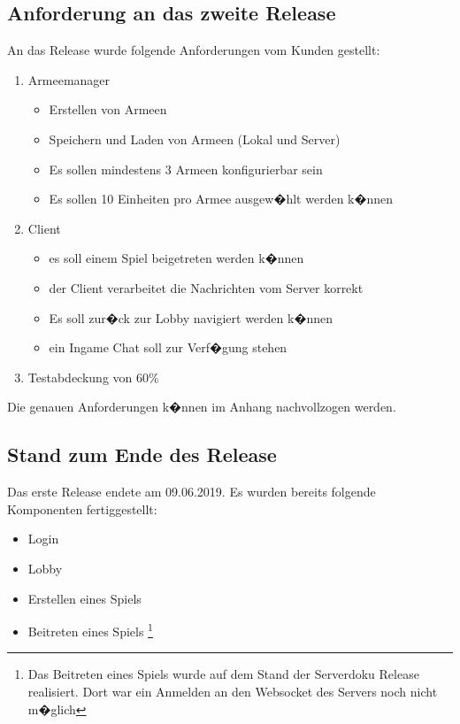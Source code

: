 \documentclass[12pt, titlepage]{scrartcl}
\newcommand{\RN}[1]{%
	\textup{\uppercase\expandafter{\romannumeral#1}}%
}
\begin{document}
		\subsection{Anforderung an das zweite Release}
			An das Release wurde folgende Anforderungen vom Kunden gestellt:
			\begin{enumerate}
				\item Armeemanager
				\begin{itemize}
					\item Erstellen von Armeen 
					\item Speichern und Laden von Armeen (Lokal und Server)
					\item Es sollen mindestens 3 Armeen konfigurierbar sein
					\item Es sollen 10 Einheiten pro Armee ausgew�hlt werden k�nnen
				\end{itemize}
				\item Client
					\begin{itemize}
						\item es soll einem Spiel beigetreten werden k�nnen
						\item der Client verarbeitet die Nachrichten vom Server korrekt
						\item Es soll zur�ck zur Lobby navigiert werden k�nnen
						\item ein Ingame Chat soll zur Verf�gung stehen
					\end{itemize}
				\item Testabdeckung von 60\%
			\end{enumerate}
		Die genauen Anforderungen k�nnen im Anhang %
		nachvollzogen werden.
		
		\subsection{Stand zum Ende des Release \RN{1}}
		Das erste Release endete am 09.06.2019. Es wurden bereits folgende Komponenten fertiggestellt:
		\begin{itemize}
			\item Login
			\item Lobby
			\item Erstellen eines Spiels
			\item Beitreten eines Spiels \footnote{Das Beitreten eines Spiels wurde auf dem Stand der Serverdoku Release \RN{1} realisiert. Dort war ein Anmelden an den Websocket des Servers noch nicht m�glich}
		\end{itemize}
\end{document}
